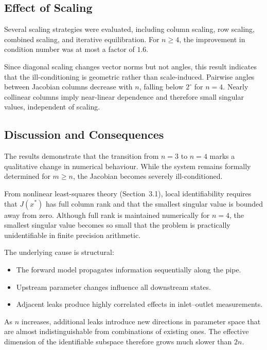 \subsection*{Effect of Scaling}

Several scaling strategies were evaluated, including column scaling, row scaling, combined scaling, and iterative equilibration. For $n \geq 4$, the improvement in condition number was at most a factor of $1.6$.

Since diagonal scaling changes vector norms but not angles, this result indicates that the ill-conditioning is geometric rather than scale-induced. Pairwise angles between Jacobian columns decrease with $n$, falling below $2^\circ$ for $n=4$. Nearly collinear columns imply near-linear dependence and therefore small singular values, independent of scaling.

\subsection*{Discussion and Consequences}

The results demonstrate that the transition from $n=3$ to $n=4$ marks a qualitative change in numerical behaviour. While the system remains formally determined for $m \geq n$, the Jacobian becomes severely ill-conditioned.

From nonlinear least-squares theory (Section~3.1), local identifiability requires that $J(x^\ast)$ has full column rank and that the smallest singular value is bounded away from zero. Although full rank is maintained numerically for $n=4$, the smallest singular value becomes so small that the problem is practically unidentifiable in finite precision arithmetic.

The underlying cause is structural:

\begin{itemize}
    \item The forward model propagates information sequentially along the pipe.
    \item Upstream parameter changes influence all downstream states.
    \item Adjacent leaks produce highly correlated effects in inlet–outlet measurements.
\end{itemize}

As $n$ increases, additional leaks introduce new directions in parameter space that are almost indistinguishable from combinations of existing ones. The effective dimension of the identifiable subspace therefore grows much slower than $2n$.

